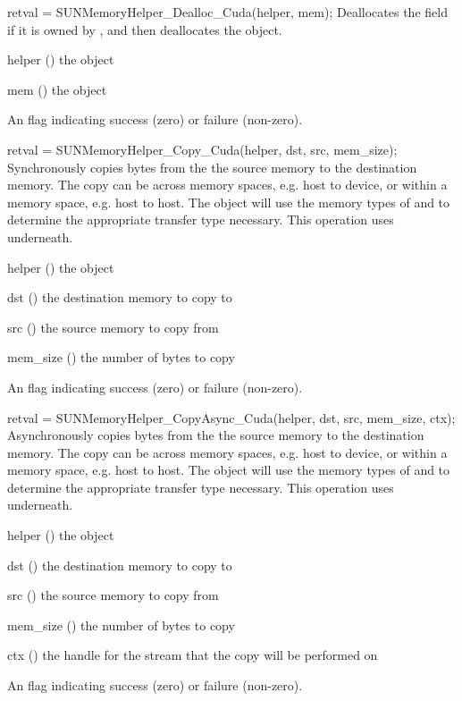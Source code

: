 {
  retval = SUNMemoryHelper\_Dealloc\_Cuda(helper, mem);
}
{
  Deallocates the  field if it is owned by , and then
  deallocates the  object.
}
{
  \begin{args}[helper]
  \item[helper] () the  object
  \item[mem] () the  object
  \end{args}
}
{
  An  flag indicating success (zero) or failure (non-zero).
}
{}

{
  retval = SUNMemoryHelper\_Copy\_Cuda(helper, dst, src, mem\_size);
}
{
  Synchronously copies  bytes from the the source memory to the
  destination memory.  The copy can be across memory spaces, e.g. host to
  device, or within a memory space, e.g. host to host. The 
  object will use the memory types of  and  to determine
  the appropriate transfer type necessary.
}
{
  This operation uses  underneath.
}
{
  \begin{args}
  \item[helper] () the  object
  \item[dst] () the destination memory to copy to
  \item[src] () the source memory to copy from
  \item[mem\_size] () the number of bytes to copy
  \end{args}
}
{
  An  flag indicating success (zero) or failure (non-zero).
}
{}

{
  retval = SUNMemoryHelper\_CopyAsync\_Cuda(helper, dst, src, mem\_size, ctx);
}
{
  Asynchronously copies  bytes from the the source memory to the
  destination memory.  The copy can be across memory spaces, e.g. host to
  device, or within a memory space, e.g. host to host. The 
  object will use the memory types of  and  to determine
  the appropriate transfer type necessary.
}
{
  This operation uses  underneath.
}
{
  \begin{args}
  \item[helper] () the  object
  \item[dst] () the destination memory to copy to
  \item[src] () the source memory to copy from
  \item[mem\_size] () the number of bytes to copy
  \item[ctx] () the  handle for the stream that the copy
  will be performed on
  \end{args}
}
{
  An  flag indicating success (zero) or failure (non-zero).
}
{}
